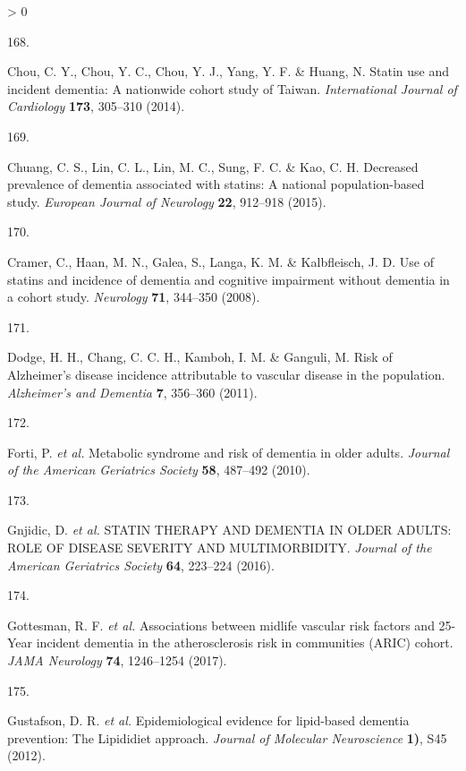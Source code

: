\documentclass[a4paper, twoside]{templates/ociamthesis}
\newlength{\cslhangindent}
\newlength{\csllabelwidth}
\newenvironment{CSLReferences}[3] %
 {%
  \setlength{\parindent}{0pt}
  \ifodd #1 \everypar{\setlength{\hangindent}{\cslhangindent}}\ignorespaces\fi
  \ifnum #2 > 0
  \setlength{\parskip}{#2\baselineskip}
  \fi
 }%
 {}
\newcommand{\CSLLeftMargin}[1]{\parbox[t]{\maxof{\widthof{#1}}{\csllabelwidth}}{#1}}
\newcommand{\CSLRightInline}[1]{\parbox[t]{\linewidth - \csllabelwidth}{#1}}
\begin{document}
\begin{CSLReferences}{0}{0}
\leavevmode\hypertarget{ref-chou2014a}{}%
\CSLLeftMargin{168. }
\CSLRightInline{Chou, C. Y., Chou, Y. C., Chou, Y. J., Yang, Y. F. \& Huang, N. Statin use and incident dementia: A nationwide cohort study of {Taiwan}. \emph{International Journal of Cardiology} \textbf{173}, 305--310 (2014).}

\leavevmode\hypertarget{ref-chuang2015}{}%
\CSLLeftMargin{169. }
\CSLRightInline{Chuang, C. S., Lin, C. L., Lin, M. C., Sung, F. C. \& Kao, C. H. Decreased prevalence of dementia associated with statins: A national population-based study. \emph{European Journal of Neurology} \textbf{22}, 912--918 (2015).}

\leavevmode\hypertarget{ref-cramer2008}{}%
\CSLLeftMargin{170. }
\CSLRightInline{Cramer, C., Haan, M. N., Galea, S., Langa, K. M. \& Kalbfleisch, J. D. Use of statins and incidence of dementia and cognitive impairment without dementia in a cohort study. \emph{Neurology} \textbf{71}, 344--350 (2008).}

\leavevmode\hypertarget{ref-dodge2011}{}%
\CSLLeftMargin{171. }
\CSLRightInline{Dodge, H. H., Chang, C. C. H., Kamboh, I. M. \& Ganguli, M. Risk of {Alzheimer}'s disease incidence attributable to vascular disease in the population. \emph{Alzheimer's and Dementia} \textbf{7}, 356--360 (2011).}

\leavevmode\hypertarget{ref-forti2010}{}%
\CSLLeftMargin{172. }
\CSLRightInline{Forti, P. \emph{et al.} Metabolic syndrome and risk of dementia in older adults. \emph{Journal of the American Geriatrics Society} \textbf{58}, 487--492 (2010).}

\leavevmode\hypertarget{ref-gnjidic2016}{}%
\CSLLeftMargin{173. }
\CSLRightInline{Gnjidic, D. \emph{et al.} {STATIN THERAPY AND DEMENTIA IN OLDER ADULTS}: {ROLE OF DISEASE SEVERITY AND MULTIMORBIDITY}. \emph{Journal of the American Geriatrics Society} \textbf{64}, 223--224 (2016).}

\leavevmode\hypertarget{ref-gottesman2017}{}%
\CSLLeftMargin{174. }
\CSLRightInline{Gottesman, R. F. \emph{et al.} Associations between midlife vascular risk factors and 25-{Year} incident dementia in the atherosclerosis risk in communities ({ARIC}) cohort. \emph{JAMA Neurology} \textbf{74}, 1246--1254 (2017).}

\leavevmode\hypertarget{ref-gustafson2012}{}%
\CSLLeftMargin{175. }
\CSLRightInline{Gustafson, D. R. \emph{et al.} Epidemiological evidence for lipid-based dementia prevention: {The Lipididiet} approach. \emph{Journal of Molecular Neuroscience} \textbf{1)}, S45 (2012).}


\end{CSLReferences}
\end{document}
